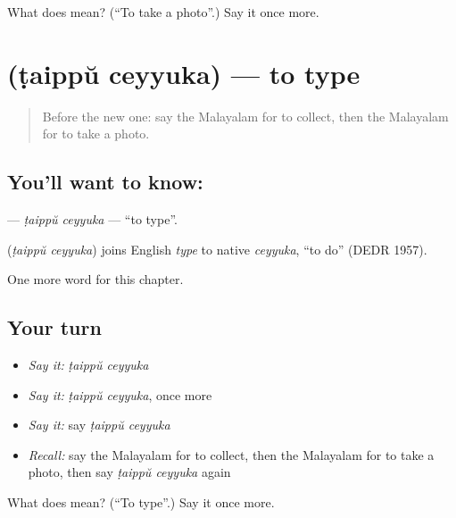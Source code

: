 \begin{tcolorbox}[breakable,colback=teal!4,colframe=teal!35!black,title={Before you move on}]
What does   mean? (\textquotedblleft{}To take a photo\textquotedblright{}.) Say it once more.
\end{tcolorbox}
\section[\texorpdfstring{\ml{ടൈപ്പ്} \ml{ചെയ്യുക} (ṭaippŭ ceyyuka)}{ടൈപ്പ് ചെയ്യുക (ṭaippŭ ceyyuka)}]{  (ṭaippŭ ceyyuka) — to type}

\label{lesson:ML-C308-taippu-ceyyuka}



\begin{quote}
Before the new one: say the Malayalam for to collect, then the Malayalam for to take a photo.
\end{quote}

\subsection*{You'll want to know:  }
\textbf{ } — \emph{ṭaippŭ ceyyuka} — \textquotedblleft{}to type\textquotedblright{}.

\begin{cousinweb}
\textbf{ } (\emph{ṭaippŭ ceyyuka}) joins English \emph{type} to native \emph{ceyyuka}, \textquotedblleft{}to do\textquotedblright{} (DEDR 1957).
\end{cousinweb}

\begin{grammarlens}[title={What you've built}]
One more word for this chapter.
\end{grammarlens}

\subsection*{Your turn}
\begin{itemize}
\raggedright
  \item \emph{Say it:} \emph{ṭaippŭ ceyyuka}
  \item \emph{Say it:} \emph{ṭaippŭ ceyyuka}, once more
  \item \emph{Say it:} say \emph{ṭaippŭ ceyyuka}
  \item \emph{Recall:} say the Malayalam for to collect, then the Malayalam for to take a photo, then say \emph{ṭaippŭ ceyyuka} again
\end{itemize}

\begin{tcolorbox}[breakable,colback=teal!4,colframe=teal!35!black,title={Before you move on}]
What does   mean? (\textquotedblleft{}To type\textquotedblright{}.) Say it once more.
\end{tcolorbox}
